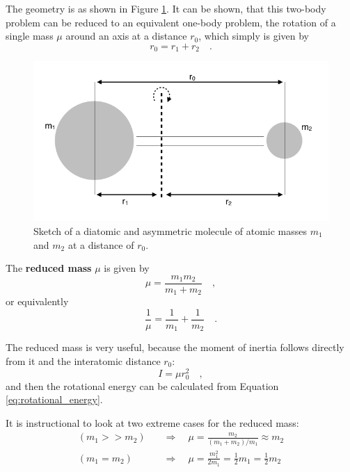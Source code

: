 The geometry is as shown in Figure \ref{fig:reduced_mass}. It can
be shown, that this two-body problem can be reduced to an equivalent
one-body problem, the rotation of a single mass $\mu$ around an axis
at a distance $r_0$, which simply is given by
\begin{equation}
  r_0 = r_1 + r_2 \quad .
\end{equation}

\begin{figure}
\begin{center}
\includegraphics[width=1\textwidth]{figures/Reduced_mass}
\caption{Sketch of a diatomic and asymmetric molecule of atomic masses $m_1$ and $m_2$ at a distance of $r_0$.}
\label{fig:reduced_mass}
\end{center}
\end{figure}

The \textbf{reduced mass} $\mu$ is given by
\begin{equation}
\label{eq:def_mu}
\mu = \frac{m_1 m_2}{m_1+m_2} \quad ,
\end{equation}
or equivalently
\begin{equation}
\frac{1}{\mu} = \frac{1}{m_1} + \frac{1}{m_2} \quad .
\end{equation}

The reduced mass is very useful, because the moment of inertia follows
directly from it and the interatomic distance $r_0$:
\begin{equation}
I = \mu r_0^2 \quad ,
\end{equation}
and then the rotational energy can be calculated from Equation \ref{eq:rotational_energy}. 

It is instructional to look at two extreme cases for the reduced
mass:
\begin{align}
(m_1 >> m_2) \quad &\Rightarrow \quad \mu = \frac{m_2}{(m_1 + m_2)/m_1} \approx  m_2 \\
(m_1 = m_2)  \quad &\Rightarrow \quad \mu = \frac{m_1^2}{2m_1} = \frac{1}{2}m_1 = \frac{1}{2}m_2
\end{align}


